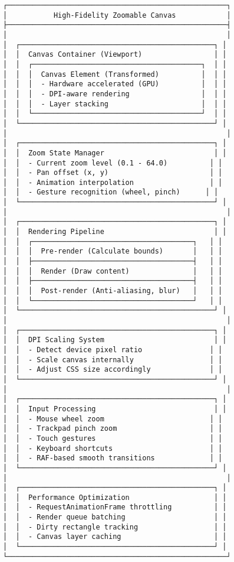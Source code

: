 \documentclass[11pt]{article}
\begin{document}
\begin{verbatim}
┌────────────────────────────────────────────────────┐
│           High-Fidelity Zoomable Canvas            │
├────────────────────────────────────────────────────┤
│                                                    │
│  ┌──────────────────────────────────────────────┐ │
│  │  Canvas Container (Viewport)                 │ │
│  │  ┌────────────────────────────────────────┐  │ │
│  │  │  Canvas Element (Transformed)          │  │ │
│  │  │  - Hardware accelerated (GPU)          │  │ │
│  │  │  - DPI-aware rendering                 │  │ │
│  │  │  - Layer stacking                      │  │ │
│  │  └────────────────────────────────────────┘  │ │
│  └──────────────────────────────────────────────┘ │
│                                                    │
│  ┌──────────────────────────────────────────────┐ │
│  │  Zoom State Manager                          │ │
│  │  - Current zoom level (0.1 - 64.0)          │ │
│  │  - Pan offset (x, y)                        │ │
│  │  - Animation interpolation                  │ │
│  │  - Gesture recognition (wheel, pinch)      │ │
│  └──────────────────────────────────────────────┘ │
│                                                    │
│  ┌──────────────────────────────────────────────┐ │
│  │  Rendering Pipeline                          │ │
│  │  ┌──────────────────────────────────────┐   │ │
│  │  │  Pre-render (Calculate bounds)       │   │ │
│  │  ├──────────────────────────────────────┤   │ │
│  │  │  Render (Draw content)               │   │ │
│  │  ├──────────────────────────────────────┤   │ │
│  │  │  Post-render (Anti-aliasing, blur)   │   │ │
│  │  └──────────────────────────────────────┘   │ │
│  └──────────────────────────────────────────────┘ │
│                                                    │
│  ┌──────────────────────────────────────────────┐ │
│  │  DPI Scaling System                          │ │
│  │  - Detect device pixel ratio                │ │
│  │  - Scale canvas internally                  │ │
│  │  - Adjust CSS size accordingly              │ │
│  └──────────────────────────────────────────────┘ │
│                                                    │
│  ┌──────────────────────────────────────────────┐ │
│  │  Input Processing                            │ │
│  │  - Mouse wheel zoom                         │ │
│  │  - Trackpad pinch zoom                      │ │
│  │  - Touch gestures                           │ │
│  │  - Keyboard shortcuts                       │ │
│  │  - RAF-based smooth transitions             │ │
│  └──────────────────────────────────────────────┘ │
│                                                    │
│  ┌──────────────────────────────────────────────┐ │
│  │  Performance Optimization                    │ │
│  │  - RequestAnimationFrame throttling          │ │
│  │  - Render queue batching                     │ │
│  │  - Dirty rectangle tracking                  │ │
│  │  - Canvas layer caching                      │ │
│  └──────────────────────────────────────────────┘ │
└────────────────────────────────────────────────────┘
\end{verbatim}
\end{document}
